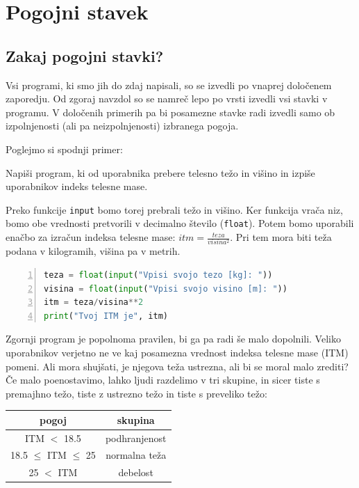\chapter{Pogojni stavek}

\section{Zakaj pogojni stavki?}

Vsi programi, ki smo jih do zdaj napisali, so se izvedli po vnaprej določenem zaporedju. Od zgoraj navzdol so se namreč lepo po vrsti izvedli vsi stavki v programu. V določenih primerih pa bi posamezne stavke radi izvedli samo ob izpolnjenosti (ali pa neizpolnjenosti) izbranega pogoja. 

Poglejmo si spodnji primer:
\begin{zgled}
Napiši program, ki od uporabnika prebere telesno težo in višino in izpiše uporabnikov indeks telesne mase.
\end{zgled}
\begin{resitev}
Preko funkcije \texttt{input} bomo torej prebrali težo in višino. Ker funkcija vrača niz, bomo obe vrednosti pretvorili v decimalno število (\texttt{float}). Potem bomo uporabili enačbo za izračun indeksa telesne mase: $itm = \frac{teza}{visina^2}$. Pri tem mora biti teža podana v kilogramih, višina pa v metrih.
\begin{lstlisting}[language=Python,numbers=left]
teza = float(input("Vpisi svojo tezo [kg]: "))
visina = float(input("Vpisi svojo visino [m]: "))
itm = teza/visina**2
print("Tvoj ITM je", itm)
\end{lstlisting}
\end{resitev}

Zgornji program je popolnoma pravilen, bi ga pa radi še malo dopolnili. Veliko uporabnikov verjetno ne ve kaj posamezna vrednost indeksa telesne mase (ITM) pomeni. Ali mora shujšati, je njegova teža ustrezna, ali bi se moral malo zrediti? Če malo poenostavimo, lahko ljudi razdelimo v tri skupine, in sicer tiste s premajhno težo, tiste z ustrezno težo in tiste s preveliko težo:

\begin{tabular}{c|c}
     pogoj & skupina \\
     \hline
     ITM $<$ 18.5 & podhranjenost\\
     18.5 $\leq$ ITM $\leq$ 25 & normalna teža\\
     25 $<$ ITM & debelost
\end{tabular}

